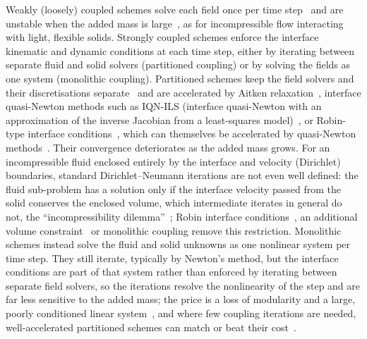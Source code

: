 Weakly (loosely) coupled schemes solve each field once per time step~\citep{farhat2000two} and are unstable when the added mass is large~\citep{Causin2005, Forster2006}, as for incompressible flow interacting with light, flexible solids.
Strongly coupled schemes enforce the interface kinematic and dynamic conditions at each time step, either by iterating between separate fluid and solid solvers (partitioned coupling) or by solving the fields as one system (monolithic coupling).
Partitioned schemes keep the field solvers and their discretisations separate~\citep{Tukovic2018} and are accelerated by Aitken relaxation~\citep{irons1969version, kuttler2008fixed}, interface quasi-Newton methods such as IQN-ILS (interface quasi-Newton with an approximation of the inverse Jacobian from a least-squares model)~\citep{Degroote2009, bungartz2016precice, Spenke2020, santiago2020hpc, delaisse2022surrogate, Delaisse2023}, or Robin-type interface conditions~\citep{BadiaNobile2008, Tukovic2018b}, which can themselves be accelerated by quasi-Newton methods~\citep{Spenke2023}.
Their convergence deteriorates as the added mass grows.
For an incompressible fluid enclosed entirely by the interface and velocity (Dirichlet) boundaries, standard Dirichlet--Neumann iterations are not even well defined: the fluid sub-problem has a solution only if the interface velocity passed from the solid conserves the enclosed volume, which intermediate iterates in general do not, the ``incompressibility dilemma''~\citep{Kuttler2006}; Robin interface conditions~\citep{BadiaNobile2008, Tukovic2018b}, an additional volume constraint~\citep{Kuttler2006} or monolithic coupling remove this restriction.
Monolithic schemes instead solve the fluid and solid unknowns as one nonlinear system per time step.
They still iterate, typically by Newton's method, but the interface conditions are part of that system rather than enforced by iterating between separate field solvers, so the iterations resolve the nonlinearity of the step and are far less sensitive to the added mass; the price is a loss of modularity and a large, poorly conditioned linear system~\citep{Heil2008}, and where few coupling iterations are needed, well-accelerated partitioned schemes can match or beat their cost~\citep{Degroote2009}.

